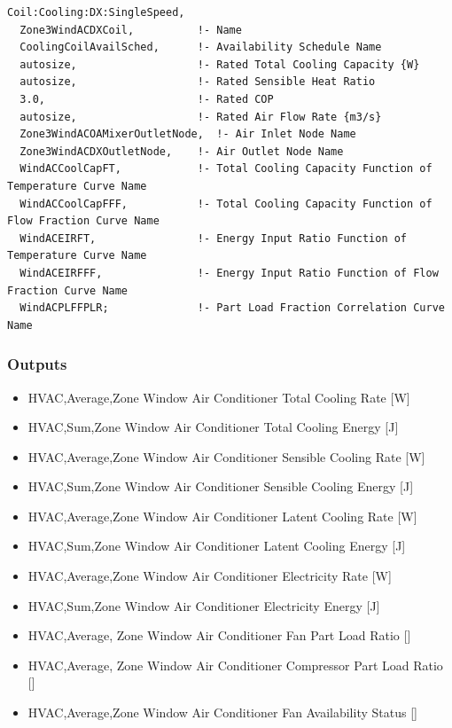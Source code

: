 \begin{lstlisting}
Coil:Cooling:DX:SingleSpeed,
  Zone3WindACDXCoil,          !- Name
  CoolingCoilAvailSched,      !- Availability Schedule Name
  autosize,                   !- Rated Total Cooling Capacity {W}
  autosize,                   !- Rated Sensible Heat Ratio
  3.0,                        !- Rated COP
  autosize,                   !- Rated Air Flow Rate {m3/s}
  Zone3WindACOAMixerOutletNode,  !- Air Inlet Node Name
  Zone3WindACDXOutletNode,    !- Air Outlet Node Name
  WindACCoolCapFT,            !- Total Cooling Capacity Function of Temperature Curve Name
  WindACCoolCapFFF,           !- Total Cooling Capacity Function of Flow Fraction Curve Name
  WindACEIRFT,                !- Energy Input Ratio Function of Temperature Curve Name
  WindACEIRFFF,               !- Energy Input Ratio Function of Flow Fraction Curve Name
  WindACPLFFPLR;              !- Part Load Fraction Correlation Curve Name
\end{lstlisting}

\subsubsection{Outputs}\label{outputs-6-012}

\begin{itemize}
\item
  HVAC,Average,Zone Window Air Conditioner Total Cooling Rate {[}W{]}
\item
  HVAC,Sum,Zone Window Air Conditioner Total Cooling Energy {[}J{]}
\item
  HVAC,Average,Zone Window Air Conditioner Sensible Cooling Rate {[}W{]}
\item
  HVAC,Sum,Zone Window Air Conditioner Sensible Cooling Energy {[}J{]}
\item
  HVAC,Average,Zone Window Air Conditioner Latent Cooling Rate {[}W{]}
\item
  HVAC,Sum,Zone Window Air Conditioner Latent Cooling Energy {[}J{]}
\item
  HVAC,Average,Zone Window Air Conditioner Electricity Rate {[}W{]}
\item
  HVAC,Sum,Zone Window Air Conditioner Electricity Energy {[}J{]}
\item
  HVAC,Average, Zone Window Air Conditioner Fan Part Load Ratio {[]}
\item
  HVAC,Average, Zone Window Air Conditioner Compressor Part Load Ratio {[]}
\item
  HVAC,Average,Zone Window Air Conditioner Fan Availability Status {[]}
\end{itemize}

